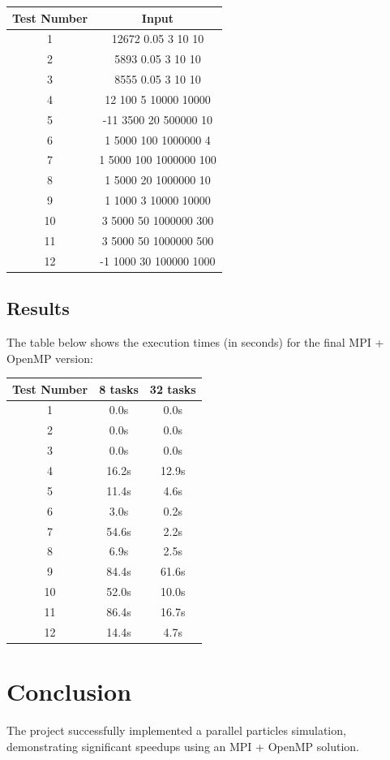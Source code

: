 \documentclass[paper=a4, fontsize=11pt]{scrartcl}
\numberwithin{equation}{section} %
\numberwithin{figure}{section}   %
\numberwithin{table}{section}    %
\begin{document}
\begin{center}
    \begin{tabular}{ | c c | }
        \hline
        Test Number & Input \\
        \hline
        1 & 12672 0.05 3 10 10 \\
        \hline
        2 & 5893 0.05 3 10 10 \\
        \hline
        3 & 8555 0.05 3 10 10 \\
        \hline
        4 & 12 100 5 10000 10000 \\
        \hline
        5 & -11 3500 20 500000 10 \\
        \hline
        6 & 1 5000 100 1000000 4 \\
        \hline
        7 & 1 5000 100 1000000 100 \\
        \hline
        8 & 1 5000 20 1000000 10 \\
        \hline
        9 & 1 1000 3 10000 10000 \\
        \hline
        10 & 3 5000 50 1000000 300 \\
        \hline
        11 & 3 5000 50 1000000 500 \\ 
        \hline
        12 & -1 1000 30 100000 1000 \\
        \hline
    \end{tabular}
\end{center}

\subsection{Results}

The table below shows the execution times (in seconds) for the final MPI + OpenMP version:

\begin{center}
    \begin{tabular}{ | c | c | c | }
        \hline
        Test Number & 8 tasks & 32 tasks \\
        \hline
        1 & 0.0s & 0.0s \\
        \hline
        2 & 0.0s & 0.0s \\
        \hline
        3 & 0.0s & 0.0s \\
        \hline
        4 & 16.2s & 12.9s \\
        \hline
        5 & 11.4s & 4.6s \\
        \hline
        6 & 3.0s & 0.2s \\
        \hline
        7 & 54.6s & 2.2s \\
        \hline
        8 & 6.9s & 2.5s \\
        \hline
        9 & 84.4s & 61.6s \\
        \hline
        10 & 52.0s & 10.0s \\
        \hline
        11 & 86.4s & 16.7s \\
        \hline
        12 & 14.4s & 4.7s \\
        \hline
    \end{tabular}
\end{center}

\section{Conclusion}

The project successfully implemented a parallel particles simulation,
demonstrating significant speedups using an MPI + OpenMP solution.

\end{document}
